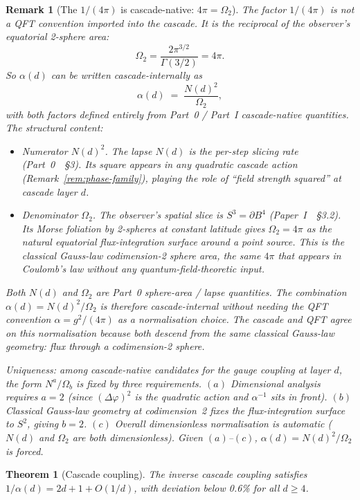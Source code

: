 \documentclass[12pt,a4paper]{article}
\newtheorem{theorem}{Theorem}[section]
\newtheorem*{remark}{Remark}
\begin{document}
\begin{remark}[The $1/(4\pi)$ is cascade-native: $4\pi = \Omega_2$]
\label{rem:alpha-geometric}
The factor $1/(4\pi)$ is not a QFT convention imported into the cascade. It is
the reciprocal of the observer's equatorial 2-sphere area:
\[
\Omega_2 = \frac{2\pi^{3/2}}{\Gamma(3/2)} = 4\pi.
\]
So $\alpha(d)$ can be written cascade-internally as
\[
\alpha(d) \;=\; \frac{N(d)^2}{\Omega_2},
\]
with both factors defined entirely from Part~0 / Part~I cascade-native
quantities. The structural content:
\begin{itemize}[nosep]
\item \emph{Numerator $N(d)^2$.} The lapse $N(d)$ is the per-step slicing rate
(Part~0~\cite{part0}~\S3). Its square appears in any quadratic cascade action
(Remark~\ref{rem:phase-family}), playing the role of ``field strength
squared'' at cascade layer $d$.
\item \emph{Denominator $\Omega_2$.} The observer's spatial slice is
$S^3 = \partial B^4$ (Paper~I~\cite{part0}~\S3.2). Its Morse foliation by
2-spheres at constant latitude gives $\Omega_2 = 4\pi$ as the natural
equatorial flux-integration surface around a point source. This is the
classical Gauss-law codimension-2 sphere area, the same $4\pi$ that appears
in Coulomb's law without any quantum-field-theoretic input.
\end{itemize}

Both $N(d)$ and $\Omega_2$ are Part~0 sphere-area / lapse quantities. The
combination $\alpha(d) = N(d)^2/\Omega_2$ is therefore cascade-internal
without needing the QFT convention $\alpha = g^2/(4\pi)$ as a normalisation
choice. The cascade and QFT agree on this normalisation because both
descend from the same classical Gauss-law geometry: flux through a
codimension-2 sphere.

\emph{Uniqueness}: among cascade-native candidates for the gauge coupling at
layer $d$, the form $N^a / \Omega_b$ is fixed by three requirements.
$(a)$ Dimensional analysis requires $a = 2$ (since $(\Delta\varphi)^2$ is
the quadratic action and $\alpha^{-1}$ sits in front).
$(b)$ Classical Gauss-law geometry at codimension~2 fixes the
flux-integration surface to $S^2$, giving $b = 2$.
$(c)$ Overall dimensionless normalisation is automatic
($N(d)$ and $\Omega_2$ are both dimensionless).
Given $(a)$--$(c)$, $\alpha(d) = N(d)^2/\Omega_2$ is forced.
\end{remark}

\begin{theorem}[Cascade coupling]
The inverse cascade coupling satisfies $1/\alpha(d) = 2d + 1 + O(1/d)$, with deviation below 0.6\% for all $d \geq 4$.
\end{theorem}
\end{document}
